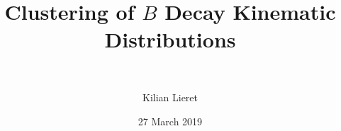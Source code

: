 %
\title%
	{
		\texorpdfstring%
			{Clustering of $B$ Decay Kinematic Distributions}%
			{Clustering of B Decay Kinematic Distributions}%
	}
%
\subtitle{\ \relax}
\author{Kilian Lieret}
\newcommand*{\coauthors}{}
\date{27 March 2019}
%
%